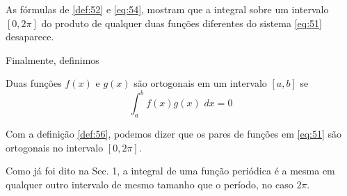 As fórmulas de \ref{def:52} e \ref{eq:54}, mostram que a integral sobre um intervalo $[0, 2\pi]$
do produto de qualquer duas funções diferentes do sistema \ref{eq:51} desaparece.

Finalmente, definimos
\begin{definicao}
\label{def:56}
    Duas funções $f(x)$ e $g(x)$ são ortogonais em um intervalo $[a,b]$ se
    \begin{equation}
        \int_{a}^{b} f(x)g(x)\hspace{4pt}dx = 0
    \end{equation}
\end{definicao}

Com a definição \ref{def:56}, podemos dizer que os pares de funções em \ref{eq:51} são
ortogonais no intervalo $[0, 2\pi]$.

Como já foi dito na Sec. 1, a integral de uma função periódica é a mesma em
qualquer outro intervalo de mesmo tamanho que o período, no caso $2\pi$.

